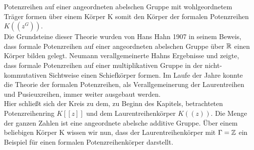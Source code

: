 Potenzreihen auf einer angeordneten abelschen Gruppe mit wohlgeordnetem Träger formen über einem Körper K somit den Körper der formalen Potenzreihen $K\left(\left(z^{G}\right)\right)$. \\
Die Grundsteine dieser Theorie wurden von Hans Hahn 1907 in seinem Beweis, dass formale Potenzreihen auf einer angeordneten abelschen Gruppe über $\mathbb{R}$ einen Körper bilden gelegt. Neumann verallgemeinerte Hahns Ergebnisse und zeigte, dass formale Potenzreihen auf einer multiplikativen Gruppe in der nicht-kommutativen Sichtweise einen Schiefkörper formen. Im Laufe der Jahre konnte die Theorie der formalen Potenzreihen, als Verallgemeinerung der Laurentreihen und Pusieuxreihen, immer weiter ausgebaut werden. \\
Hier schließt sich der Kreis zu dem, zu Beginn des Kapitels, betrachteten Potenzreihenring $K[[z]]$ und dem Laurentreihenkörper $K((z))$. Die Menge der ganzen Zahlen ist eine angeordnete abelsche additive Gruppe. Über einem beliebigen Körper K wissen wir nun, dass der Laurentreihenkörper mit $\Gamma = \mathbb{Z}$ ein Beispiel für einen formalen Potenzreihenkörper darstellt.
%
%
%
%
%
%
%

